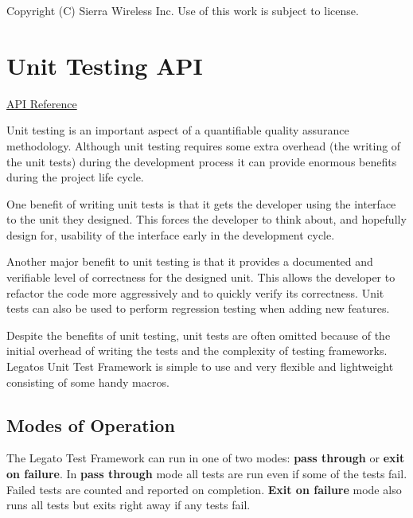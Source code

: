 Copyright (C) Sierra Wireless Inc. Use of this work is subject to license. \hypertarget{c_test}{}\section{Unit Testing A\+P\+I}\label{c_test}
\hyperlink{le__test_8h}{A\+P\+I Reference}





Unit testing is an important aspect of a quantifiable quality assurance methodology. Although unit testing requires some extra overhead (the writing of the unit tests) during the development process it can provide enormous benefits during the project life cycle.

One benefit of writing unit tests is that it gets the developer using the interface to the unit they designed. This forces the developer to think about, and hopefully design for, usability of the interface early in the development cycle.

Another major benefit to unit testing is that it provides a documented and verifiable level of correctness for the designed unit. This allows the developer to refactor the code more aggressively and to quickly verify its correctness. Unit tests can also be used to perform regression testing when adding new features.

Despite the benefits of unit testing, unit tests are often omitted because of the initial overhead of writing the tests and the complexity of testing frameworks. Legato\textquotesingle{}s Unit Test Framework is simple to use and very flexible and lightweight consisting of some handy macros.\hypertarget{c_test_c_test_modes}{}\subsection{Modes of Operation}\label{c_test_c_test_modes}
The Legato Test Framework can run in one of two modes\+: {\bfseries pass through} or {\bfseries exit on failure}. In {\bfseries pass through} mode all tests are run even if some of the tests fail. Failed tests are counted and reported on completion. {\bfseries Exit on failure} mode also runs all tests but exits right away if any tests fail.

